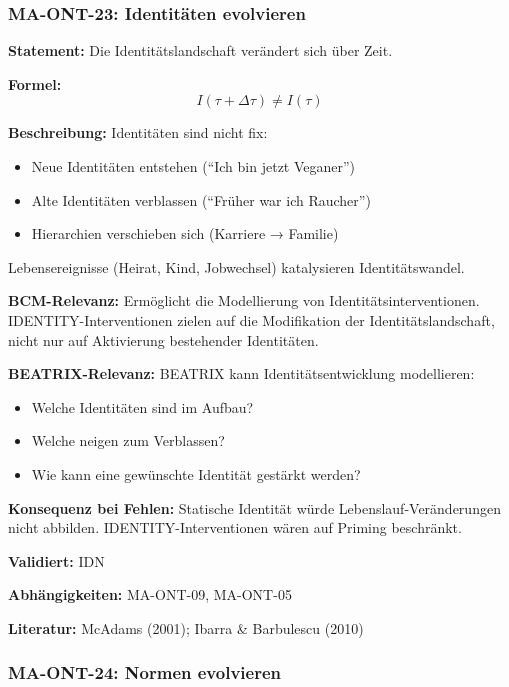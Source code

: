 \subsubsection*{MA-ONT-23: Identitäten evolvieren}

\textbf{Statement:} Die Identitätslandschaft verändert sich über Zeit.

\textbf{Formel:}
\begin{equation}
I(\tau + \Delta\tau) \neq I(\tau)
\end{equation}

\textbf{Beschreibung:}
Identitäten sind nicht fix:
\begin{itemize}
    \item Neue Identitäten entstehen (``Ich bin jetzt Veganer'')
    \item Alte Identitäten verblassen (``Früher war ich Raucher'')
    \item Hierarchien verschieben sich (Karriere → Familie)
\end{itemize}
Lebensereignisse (Heirat, Kind, Jobwechsel) katalysieren Identitätswandel.

\textbf{BCM-Relevanz:}
Ermöglicht die Modellierung von Identitätsinterventionen. IDENTITY-Interventionen zielen auf die Modifikation der Identitätslandschaft, nicht nur auf Aktivierung bestehender Identitäten.

\textbf{BEATRIX-Relevanz:}
BEATRIX kann Identitätsentwicklung modellieren:
\begin{itemize}
    \item Welche Identitäten sind im Aufbau?
    \item Welche neigen zum Verblassen?
    \item Wie kann eine gewünschte Identität gestärkt werden?
\end{itemize}

\textbf{Konsequenz bei Fehlen:}
Statische Identität würde Lebenslauf-Veränderungen nicht abbilden. IDENTITY-Interventionen wären auf Priming beschränkt.

\textbf{Validiert:} IDN

\textbf{Abhängigkeiten:} MA-ONT-09, MA-ONT-05

\textbf{Literatur:} McAdams (2001); Ibarra \& Barbulescu (2010)


\subsubsection*{MA-ONT-24: Normen evolvieren}

